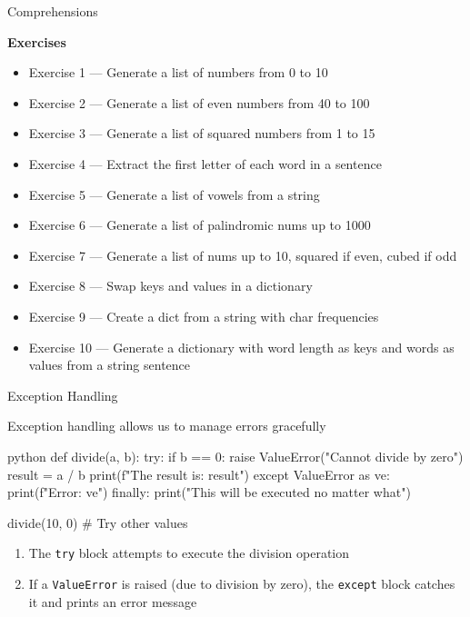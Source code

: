 \documentclass[
	11pt, 
]{beamer}
\begin{document}

\begin{frame}[fragile]{Comprehensions}


\begin{alertblock}{\textbf{Exercises}}
\begin{itemize}
    \item Exercise 1 --- Generate a list of numbers from 0 to 10
    \item Exercise 2 --- Generate a list of even numbers from 40 to 100
    \item Exercise 3 --- Generate a list of squared numbers from 1 to 15
    \item Exercise 4 --- Extract the first letter of each word in a sentence
    \item Exercise 5 --- Generate a list of vowels from a string
    \item Exercise 6 --- Generate a list of palindromic nums up to 1000
    \item Exercise 7 --- Generate a list of nums up to 10, squared if even, cubed if odd
    \item Exercise 8 --- Swap keys and values in a dictionary
    \item Exercise 9 --- Create a dict from a string with char frequencies
    \item Exercise 10 --- Generate a dictionary with word length as keys and words as values from a string sentence
\end{itemize}
\end{alertblock}
\end{frame}



\begin{frame}[fragile]{Exception Handling}

Exception handling allows us to manage errors gracefully

\begin{mintedbox}{python}
def divide(a, b):
    try:
        if b == 0:
            raise ValueError("Cannot divide by zero")
        result = a / b
        print(f"The result is: {result}")
    except ValueError as ve:
        print(f"Error: {ve}")
    finally:
        print("This will be executed no matter what")

divide(10, 0) # Try other values
\end{mintedbox}

\begin{enumerate}
    \item The \texttt{try} block attempts to execute the division operation
    \item If a \texttt{ValueError} is raised (due to division by zero), the \texttt{except} block catches it and prints an error message
\end{enumerate}

\end{frame}
\end{document}
